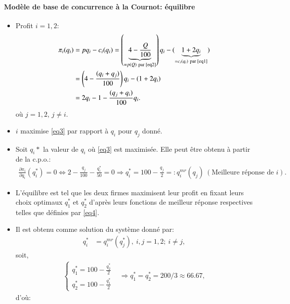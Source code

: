 \begin{frame}[allowframebreaks]{\insertsection}
\framesubtitle{Modèle de base de concurrence à la Cournot: équilibre}
    \begin{itemize}
        \item Profit $i=1, 2$:
        \begin{align}
            \pi_i(q_i) &= pq_i - c_i(q_i) = \left(\underbrace{4-\frac{Q}{100}}_{ =  p(Q) \ \text{par \eqref{eq2}}}\right)q_i 
            - (\underbrace{1+2q_i}_{=c_i(q_i) \ \text{par \eqref{eq1}}}) \nonumber\\
            &= \left(4-\frac{(q_i + q_j)}{100}\right)q_i - (1+ 2q_i) \nonumber\\
            &= 2q_i - 1 - \frac{(q_j + q_i)}{100}q_i.
            \label{eq3}
        \end{align}
        où $j=1,2$, $j\neq i$.
        \item $i$ maximise \eqref{eq3} par rapport à $q_i$ pour $q_j$ donné. 
        \item Soit $q_i*$ la valeur de $q_i$ où  \eqref{eq3} est maximisée. Elle peut être obtenu à partir de la c.p.o.:
        \begin{align}
          \frac{\partial \pi_i}{\partial q_i}(q_i^*) = 0 \Leftrightarrow 2 -\frac{q_j}{100} - \frac{q_i^*}{50} = 0
             \Rightarrow q_i^* = 100 - \frac{q_j}{2} =: q_i^{mr}(q_j)  \ (\text{Meilleure réponse de $i$}).
             \label{eq4}
        \end{align}
        \item L'équilibre est tel que les deux firmes maximisent leur profit en fixant leurs choix optimaux  $q_1^*$ et $q_2^*$  d'après leurs fonctions de meilleur réponse respectives telles que définies par \eqref{eq4}.
        \item Il est obtenu comme solution du système donné par:
        \begin{align*}
        q_i^* &= q_i^{mr}(q^*_j) , \ i, j = 1, 2; \ i\neq j,
        \end{align*}
        soit,
        \begin{align*}
            \left\{
            \begin{array}{l}
            q_1^* = 100 - \frac{q_2^*}{2}\\
            q_2^* = 100 - \frac{q_1^*}{2}
            \end{array}
            \right.
            &\Rightarrow q_1^* = q_2^* = 200/3 \approx 66.67,
        \end{align*}
        d'où:

\end{itemize}
\end{frame}
